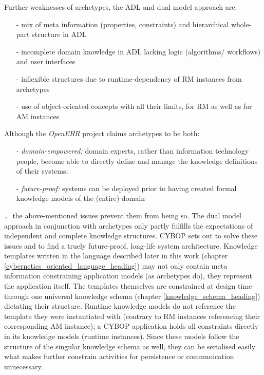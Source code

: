 Further weaknesses of archetypes, the ADL and dual model approach are:

\begin{itemize}
    \item[-] mix of meta information (properties, constraints) and hierarchical whole-part structure in ADL
    \item[-] incomplete domain knowledge in ADL lacking logic (algorithms/ workflows) and user interfaces
    \item[-] inflexible structures due to runtime-dependency of RM instances from archetypes
    \item[-] use of object-oriented concepts with all their limits, for RM as well as for AM instances
\end{itemize}

Although the \emph{OpenEHR} project \cite{openehr} claims archetypes to be both:

\begin{enumerate}
    \item[-] \emph{domain-empowered:} domain experts, rather than information
        technology people, become able to directly define and manage the
        knowledge definitions of their systems;
    \item[-] \emph{future-proof:} systems can be deployed prior to having
        created formal knowledge models of the (entire) domain
\end{enumerate}

\ldots\ the above-mentioned issues prevent them from being so. The dual model
approach in conjunction with archetypes only partly fulfills the expectations
of independent and complete knowledge structures. CYBOP sets out to solve these
issues and to find a truely future-proof, long-life system architecture.
Knowledge templates written in the language described later in this work
(chapter \ref{cybernetics_oriented_language_heading}) may not only contain meta
information constraining application models (as archetypes do), they represent
the application itself. The templates themselves are constrained at design time
through one universal knowledge schema (chapter \ref{knowledge_schema_heading})
dictating their structure. Runtime knowledge models do not reference the
template they were instantiated with (contrary to RM instances referencing
their corresponding AM instance); a CYBOP application holds all constraints
directly in its knowledge models (runtime instances). Since these models follow
the structure of the singular knowledge schema as well, they can be serialised
easily what makes further constrain activities for persistence or communication
unnecessary.
